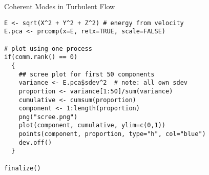 \begin{frame}
  \begin{exampleblock}{Coherent Modes in Turbulent Flow}\pause
\begin{lstlisting}[title=Compute PCA and do Scree Plot (0\_pca.r)]
E <- sqrt(X^2 + Y^2 + Z^2) # energy from velocity
E.pca <- prcomp(x=E, retx=TRUE, scale=FALSE) 

# plot using one process
if(comm.rank() == 0)
  {
    ## scree plot for first 50 components
    variance <- E.pca$sdev^2  # note: all own sdev
    proportion <- variance[1:50]/sum(variance)
    cumulative <- cumsum(proportion)
    component <- 1:length(proportion)
    png("scree.png")
    plot(component, cumulative, ylim=c(0,1))
    points(component, proportion, type="h", col="blue")
    dev.off()
  }

finalize()
        
\end{lstlisting} %
  \end{exampleblock}
\end{frame}
